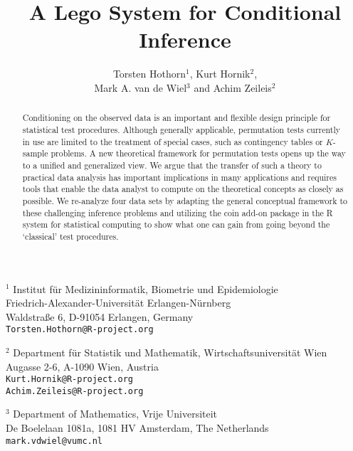 \documentclass{article}
\newcommand{\Rpackage}[1]{{\normalfont\fontseries{b}\selectfont #1}}
\newcommand{\RR}{\textsf{R}}
\begin{document}
\title{A Lego System for Conditional Inference}

\author{Torsten Hothorn$^1$, Kurt Hornik$^2$, \\ 
            Mark A. van de Wiel$^3$ and Achim Zeileis$^2$}

\date{}

\maketitle

\thispagestyle{empty}

\noindent$^1$ Institut f\"ur Medizininformatik, Biometrie und Epidemiologie\\
           Friedrich-Alexander-Universit\"at Erlangen-N\"urnberg\\
           Waldstra{\ss}e 6, D-91054 Erlangen, Germany \\
           \texttt{Torsten.Hothorn@R-project.org}
         \newline

         \noindent$^2$ Department f\"ur Statistik und Mathematik,
            Wirtschaftsuniversit\"at Wien \\
            Augasse 2-6, A-1090 Wien, Austria \\
            \texttt{Kurt.Hornik@R-project.org} \\
            \texttt{Achim.Zeileis@R-project.org}
         \newline

         \noindent$^3$ Department of Mathematics, Vrije Universiteit \\
                        De Boelelaan 1081a, 1081 HV Amsterdam, The Netherlands \\
            \texttt{mark.vdwiel@vumc.nl}
         \newline

\begin{abstract}
Conditioning on the observed data is an important and flexible 
design principle for statistical test procedures. Although generally
applicable, permutation tests currently in use are limited to 
the treatment of special cases, such as contingency tables or $K$-sample
problems. A new theoretical framework for permutation
tests opens up the way to a unified and generalized view. We argue that the
transfer of such a theory to practical data analysis has important
implications in many applications and requires tools that enable the
data analyst to compute on the theoretical concepts as closely as possible.
We re-analyze four data sets
by adapting the general conceptual framework to these challenging inference
problems and
utilizing the \Rpackage{coin} add-on package in the \RR{} system for statistical computing
to show what one can gain from going beyond the `classical' test procedures.
\end{abstract}
\end{document}
